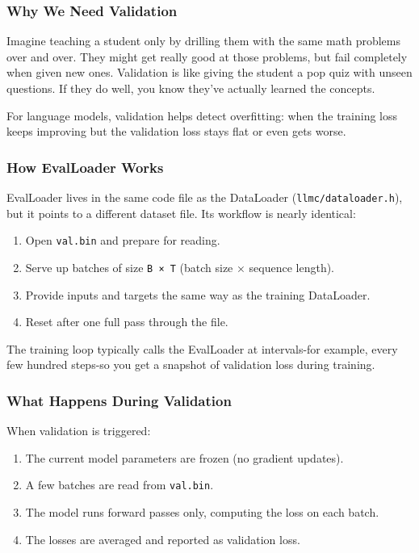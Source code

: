 \documentclass[
  letterpaper,
  DIV=11,
  numbers=noendperiod]{scrreprt}
\providecommand{\tightlist}{%
  \setlength{\itemsep}{0pt}\setlength{\parskip}{0pt}}
\begin{document}
\subsubsection{Why We Need Validation}\label{why-we-need-validation}

Imagine teaching a student only by drilling them with the same math
problems over and over. They might get really good at those problems,
but fail completely when given new ones. Validation is like giving the
student a pop quiz with unseen questions. If they do well, you know
they've actually learned the concepts.

For language models, validation helps detect overfitting: when the
training loss keeps improving but the validation loss stays flat or even
gets worse.

\subsubsection{How EvalLoader Works}\label{how-evalloader-works}

EvalLoader lives in the same code file as the DataLoader
(\texttt{llmc/dataloader.h}), but it points to a different dataset file.
Its workflow is nearly identical:

\begin{enumerate}
\def\labelenumi{\arabic{enumi}.}
\tightlist
\item
  Open \texttt{val.bin} and prepare for reading.
\item
  Serve up batches of size \texttt{B\ ×\ T} (batch size × sequence
  length).
\item
  Provide inputs and targets the same way as the training DataLoader.
\item
  Reset after one full pass through the file.
\end{enumerate}

The training loop typically calls the EvalLoader at intervals-for
example, every few hundred steps-so you get a snapshot of validation
loss during training.

\subsubsection{What Happens During
Validation}\label{what-happens-during-validation}

When validation is triggered:

\begin{enumerate}
\def\labelenumi{\arabic{enumi}.}
\tightlist
\item
  The current model parameters are frozen (no gradient updates).
\item
  A few batches are read from \texttt{val.bin}.
\item
  The model runs forward passes only, computing the loss on each batch.
\item
  The losses are averaged and reported as validation loss.
\end{enumerate}
\end{document}
